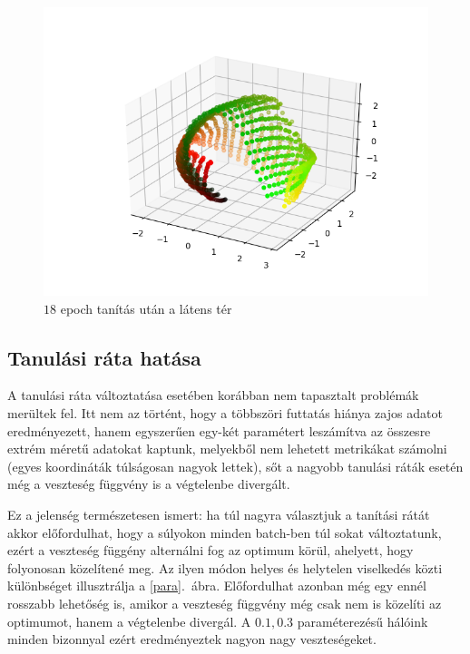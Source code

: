 \begin{figure}[h!]
\begin{center}
 
	\begin{center}
	\includegraphics[width=1\linewidth]{metrics/3D-epoch18.png}
	\end{center}
	
  \caption{$18$ epoch tanítás után a látens tér}\label{3D-epoch}
\end{center}
\end{figure}

\subsection{Tanulási ráta hatása}

A tanulási ráta változtatása esetében korábban nem tapasztalt problémák merültek fel. Itt nem az történt, hogy a többszöri futtatás hiánya zajos adatot eredményezett, hanem egyszerűen egy-két paramétert leszámítva az összesre extrém méretű adatokat kaptunk, melyekből nem lehetett metrikákat számolni (egyes koordináták túlságosan nagyok lettek), sőt a nagyobb tanulási ráták esetén még a veszteség függvény is a végtelenbe divergált.

Ez a jelenség természetesen ismert: ha túl nagyra választjuk a tanítási rátát akkor előfordulhat, hogy a súlyokon minden batch-ben túl sokat változtatunk, ezért a veszteség függény alternálni fog az optimum körül, ahelyett, hogy folyonosan közelítené meg. Az ilyen módon helyes és helytelen viselkedés közti különbséget illusztrálja a \ref{para}.~ábra. Előfordulhat azonban még egy ennél rosszabb lehetőség is, amikor a veszteség függvény még csak nem is közelíti az optimumot, hanem a végtelenbe divergál. A $0.1, 0.3$ paraméterezésű hálóink minden bizonnyal ezért eredményeztek nagyon nagy veszteségeket.

